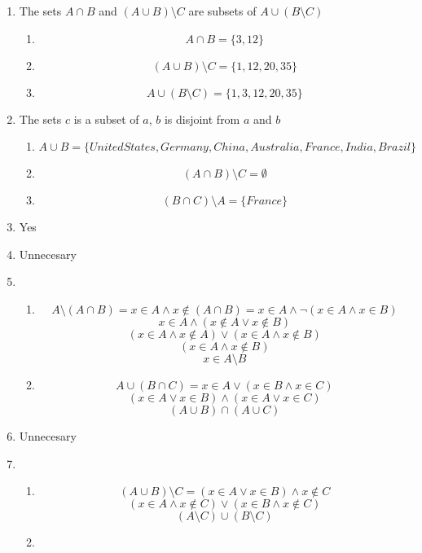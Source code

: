 \begin{enumerate}
    \item The sets $A \cap B$ and $(A \cup B) \setminus C$ are subsets of $A \cup (B \setminus C)$
    \begin{enumerate}
        \item 
            \[A \cap B = \{3,12\}\]
        \item 
            \[(A \cup B) \setminus C = \{1,12,20,35\}\]
        \item 
            \[A \cup (B \setminus C) = \{1,3,12,20,35\}\]
    \end{enumerate}
    \item The sets $c$ is a subset of $a$, $b$ is disjoint from $a$ and $b$
    \begin{enumerate}
        \item 
        \[A \cup B = \{United States, Germany, China, Australia, France, India, Brazil\}\]
        \item 
        \[(A \cap B) \setminus C = \emptyset\]
        \item 
        \[(B \cap C) \setminus A = \{France\}\]
    \end{enumerate}
    \item Yes
    \item Unnecesary
    \item
    \begin{enumerate}
        \item 
        \[A \setminus (A \cap B) = x \in A \land x \notin (A \cap B) = x \in A \land \lnot (x \in A \land x \in B)\]
        \[x \in A \land (x \notin A \lor x \notin B)\]
        \[(x \in A \land x \notin A) \lor (x \in A \land x \notin B)\]
        \[(x \in A \land x \notin B)\]
        \[x \in A \setminus B\]
        \item 
        \[A \cup (B \cap C) = x \in A \lor (x \in B \land x \in C)\]
        \[(x \in A \lor x \in B) \land (x \in A \lor x \in C)\]
        \[(A \cup B) \cap (A \cup C)\]
    \end{enumerate}
    \item Unnecesary
    \item 
    \begin{enumerate}
        \item 
        \[(A \cup B) \setminus C = (x \in A \lor x \in B) \land x \notin C\]
        \[(x \in A \land x\notin C) \lor (x \in B \land x \notin C)\]
        \[(A \setminus C) \cup (B \setminus C)\]
        \item 

\end{enumerate}
\end{enumerate}
